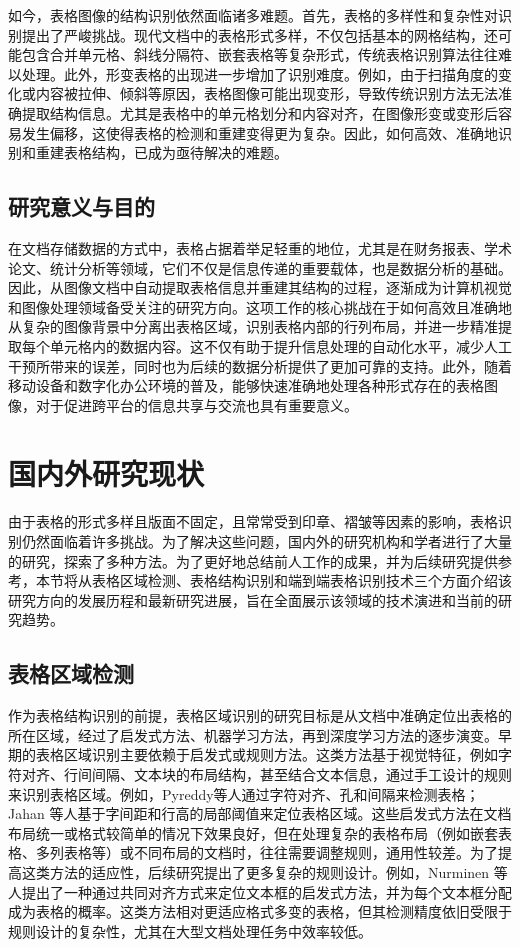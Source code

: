 \documentclass[UTF8,12pt, AutoFakeBold,fontset = founder]{ctexart}
\begin{document}
如今，表格图像的结构识别依然面临诸多难题。首先，表格的多样性和复杂性对识别提出了严峻挑战。现代文档中的表格形式多样，不仅包括基本的网格结构，还可能包含合并单元格、斜线分隔符、嵌套表格等复杂形式，传统表格识别算法往往难以处理。此外，形变表格的出现进一步增加了识别难度。例如，由于扫描角度的变化或内容被拉伸、倾斜等原因，表格图像可能出现变形，导致传统识别方法无法准确提取结构信息。尤其是表格中的单元格划分和内容对齐，在图像形变或变形后容易发生偏移，这使得表格的检测和重建变得更为复杂。因此，如何高效、准确地识别和重建表格结构，已成为亟待解决的难题。

\subsection{研究意义与目的}

在文档存储数据的方式中，表格占据着举足轻重的地位，尤其是在财务报表、学术论文、统计分析等领域，它们不仅是信息传递的重要载体，也是数据分析的基础。因此，从图像文档中自动提取表格信息并重建其结构的过程，逐渐成为计算机视觉和图像处理领域备受关注的研究方向。这项工作的核心挑战在于如何高效且准确地从复杂的图像背景中分离出表格区域，识别表格内部的行列布局，并进一步精准提取每个单元格内的数据内容。这不仅有助于提升信息处理的自动化水平，减少人工干预所带来的误差，同时也为后续的数据分析提供了更加可靠的支持。此外，随着移动设备和数字化办公环境的普及，能够快速准确地处理各种形式存在的表格图像，对于促进跨平台的信息共享与交流也具有重要意义。

\section{国内外研究现状}

由于表格的形式多样且版面不固定，且常常受到印章、褶皱等因素的影响，表格识别仍然面临着许多挑战。为了解决这些问题，国内外的研究机构和学者进行了大量的研究，探索了多种方法。为了更好地总结前人工作的成果，并为后续研究提供参考，本节将从表格区域检测、表格结构识别和端到端表格识别技术三个方面介绍该研究方向的发展历程和最新研究进展，旨在全面展示该领域的技术演进和当前的研究趋势。

\subsection{表格区域检测}

作为表格结构识别的前提，表格区域识别的研究目标是从文档中准确定位出表格的所在区域，经过了启发式方法、机器学习方法，再到深度学习方法的逐步演变。早期的表格区域识别主要依赖于启发式或规则方法。这类方法基于视觉特征，例如字符对齐、行间间隔、文本块的布局结构，甚至结合文本信息，通过手工设计的规则来识别表格区域。例如，Pyreddy\cite{m1}等人通过字符对齐、孔和间隔来检测表格；Jahan 等人基于字间距和行高的局部阈值来定位表格区域。这些启发式方法在文档布局统一或格式较简单的情况下效果良好，但在处理复杂的表格布局（例如嵌套表格、多列表格等）或不同布局的文档时，往往需要调整规则，通用性较差。为了提高这类方法的适应性，后续研究提出了更多复杂的规则设计。例如，Nurminen 等人提出了一种通过共同对齐方式来定位文本框的启发式方法，并为每个文本框分配成为表格的概率。这类方法相对更适应格式多变的表格，但其检测精度依旧受限于规则设计的复杂性，尤其在大型文档处理任务中效率较低。
\end{document}
